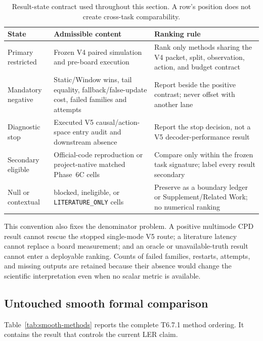 \documentclass[11pt]{article}
\begin{document}
\begin{table}[htbp]
\centering
\small
\caption{Result-state contract used throughout this section.  A row's position
does not create cross-task comparability.}
\label{tab:result-state-contract}
\begin{tabularx}{\textwidth}{@{}L{0.20\textwidth} L{0.25\textwidth} Y@{}}
\toprule
State & Admissible content & Ranking rule \\
\midrule
Primary restricted & Frozen V4 paired simulation and pre-board execution & Rank only methods sharing the V4 packet, split, observation, action, and budget contract \\
Mandatory negative & Static/Window wins, tail equality, fallback/false-update cost, failed families and attempts & Report beside the positive contrast; never offset with another lane \\
Diagnostic stop & Executed V5 causal/action-space entry audit and downstream absence & Report the stop decision, not a V5 decoder-performance result \\
Secondary eligible & Official-code reproduction or project-native matched Phase~6C cells & Compare only within the frozen task signature; label every result secondary \\
Null or contextual & blocked, ineligible, or \texttt{LITERATURE\_ONLY} cells & Preserve as a boundary ledger or Supplement/Related Work; no numerical ranking \\
\bottomrule
\end{tabularx}
\end{table}

This convention also fixes the denominator problem.  A positive multimode CPD
result cannot rescue the stopped single-mode V5 route; a literature latency
cannot replace a board measurement; and an oracle or unavailable-truth result
cannot enter a deployable ranking.  Counts of failed families, restarts,
attempts, and missing outputs are retained because their absence would change
the scientific interpretation even when no scalar metric is available.

\subsection{Untouched smooth formal comparison}

Table~\ref{tab:smooth-methods} reports the complete T6.7.1 method ordering.  It
contains the result that controls the current LER claim.
\end{document}
